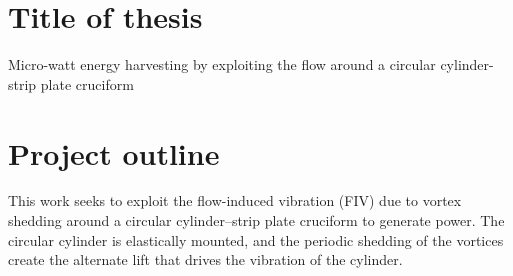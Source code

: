 \documentclass[a4paper]{article}
\begin{document}
\newcommand{\uon}{\unit{0.1}{\metre\per\second}}
\newcommand{\utw}{\unit{0.2}{\metre\per\second}}
\newcommand{\uth}{\unit{0.3}{\metre\per\second}}
\newcommand{\ufo}{\unit{0.4}{\metre\per\second}}
\newcommand{\ufi}{\unit{0.5}{\metre\per\second}}
\newcommand{\usi}{\unit{0.6}{\metre\per\second}}
\newcommand{\use}{\unit{0.7}{\metre\per\second}}
\newcommand{\uei}{\unit{0.8}{\metre\per\second}}
\newcommand{\uni}{\unit{0.9}{\metre\per\second}}
\newcommand{\ute}{\unit{1.0}{\metre\per\second}}
\newcommand{\uel}{\unit{1.1}{\metre\per\second}}
\newcommand{\utv}{\unit{1.2}{\metre\per\second}}
\newcommand{\utt}{\unit{1.3}{\metre\per\second}}

\newcommand{\ptlt}{$\theta_{\text{plate}}$}
\newcommand{\rze}{\unit{0}{\radian}}
\newcommand{\ron}{\unit{\pi/8}{\radian}}
\newcommand{\rtw}{\unit{\pi/4}{\radian}}
\newcommand{\rth}{\unit{3\pi/8}{\radian}}
\newcommand{\rfo}{\unit{\pi/2}{\radian}}

\newcommand{\ypl}{$y^{+}$} %
\newcommand{\ured}{$U^{*}$} %
\newcommand{\yrms}{$y^{*}_{\text{RMS}}$} %

\newcommand{\uron}{$2.3$}
\newcommand{\urtw}{$4.5$}
\newcommand{\urth}{$6.8$}
\newcommand{\urfo}{$9.1$}
\newcommand{\urfi}{$11.4$}
\newcommand{\ursi}{$13.6$}
\newcommand{\urse}{$15.9$}
\newcommand{\urei}{$18.2$}
\newcommand{\urni}{$20.5$}
\newcommand{\urte}{$22.7$}
\newcommand{\urel}{$25.0$}
\newcommand{\urtv}{$27.3$}
\newcommand{\urtt}{$29.5$}

\newcommand{\es}{$=$}

\section{Title of thesis}
Micro-watt energy harvesting by exploiting the flow around a circular cylinder-strip plate cruciform

\section{Project outline} \label{outline}
This work seeks to exploit the flow-induced vibration (FIV) due to vortex shedding around a circular cylinder--strip plate cruciform to generate power. The circular cylinder is elastically mounted, and the periodic shedding of the vortices create the alternate lift that drives the vibration of the cylinder.
\end{document}
